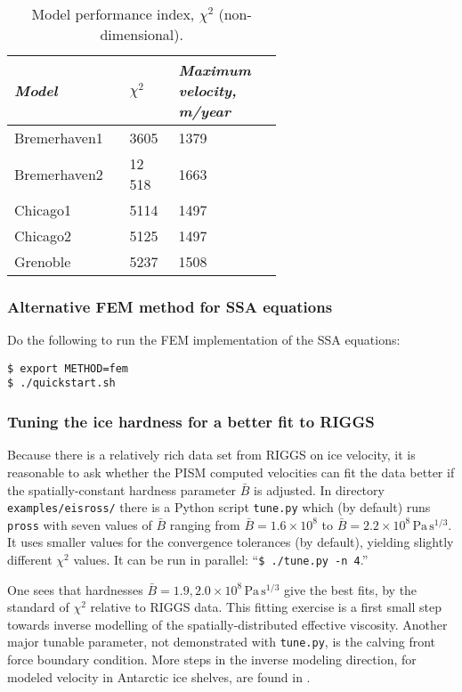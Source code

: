 \small
\begin{table}[ht]
\centering
\begin{tabular}{p{0.2\linewidth}p{0.1\linewidth}p{0.3\linewidth}}\toprule
\textsl{Model} & $\chi^2$ & \textsl{Maximum velocity, m/year} \\\midrule
Bremerhaven1 & 3605 & 1379 \\
Bremerhaven2 & 12\,518 & 1663 \\
Chicago1 & 5114 & 1497 \\
Chicago2 & 5125 & 1497 \\
Grenoble & 5237 & 1508 \\
\bottomrule
\end{tabular}
\label{tab:chisqr}
\caption{Model performance index, $\chi^2$ (non-dimensional).  }
\end{table}
\normalsize

\subsubsection*{Alternative FEM method for SSA equations}  Do the following to run the FEM implementation of the SSA equations:

\begin{verbatim}
$ export METHOD=fem
$ ./quickstart.sh
\end{verbatim}


\subsubsection*{Tuning the ice hardness for a better fit to RIGGS}  Because there is a relatively rich data set from RIGGS on ice velocity, it is reasonable to ask whether the PISM computed velocities can fit the data better if the spatially-constant hardness parameter $\bar B$ is adjusted.  In directory \texttt{examples/eisross/} there is a Python script \texttt{tune.py} which (by default) runs \texttt{pross} with seven values of $\bar B$ ranging from $\bar B = 1.6  \times 10^8$ to $\bar B = 2.2 \times 10^8 \, \text{Pa}\, \text{s}^{1/3}$.  It uses smaller values for the convergence tolerances (by default), yielding slightly different $\chi^2$ values.  It can be run in parallel: ``\texttt{\$ ./tune.py -n 4}.''

One sees that hardnesses $\bar B = 1.9,2.0 \times 10^8 \, \text{Pa}\, \text{s}^{1/3}$ give the best fits, by the standard of $\chi^2$ relative to RIGGS data.  This fitting exercise is a first small step towards inverse modelling of the spatially-distributed effective viscosity.  Another major tunable parameter, not demonstrated with \texttt{tune.py}, is the calving front force boundary condition.  More steps in the inverse modeling direction, for modeled velocity in Antarctic ice shelves, are found in \cite{HumbertGreveHutter,RommelaereMacAyeal}.



